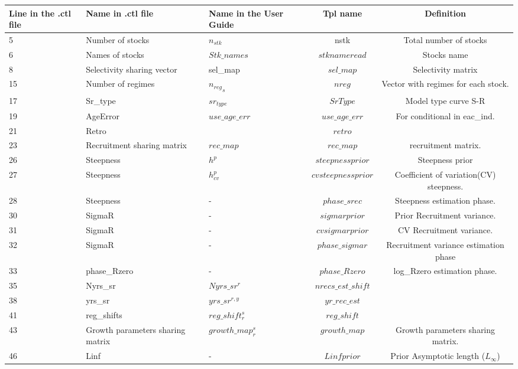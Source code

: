 \documentclass{article}
\begin{document}
\begin{tabular}{|  p{0.9cm} | p{1.9cm}  | p{1.9cm} | c | c |}
\hline
Line in the .ctl file & Name in .ctl file  & Name in the User Guide & Tpl name & Definition\\ \hline  \hline
 5 &  Number of stocks & $n_{stk}$  & nstk & Total number of stocks\\ \hline
6 &  Names of stocks & $Stk\_names$ & $stknameread$   & Stocks name\\ \hline
8 &  Selectivity sharing vector & sel\_map  & $sel\_map$ & Selectivity matrix\\ \hline
15 &  Number of regimes &  ${n_{reg}}_s$ & $nreg$ & Vector with regimes for each stock.\\ \hline
17 &  Sr\_type & $sr_{type}$  & $SrType$ & Model type curve S-R\\ \hline
19 &  AgeError & $use\_age\_err$  & $use\_age\_err$ & For conditional in eac\_ind.\\ \hline
21 &  Retro &   & $retro$ &\\ \hline
23 & Recruitment sharing matrix &  $rec\_map$ & $rec\_map$ & recruitment matrix.\\ \hline
26 &  Steepness & $h^p$  & $steepnessprior$ & Steepness prior\\ \hline
27 &  Steepness & $h^p_{cv}$  & $cvsteepnessprior$ & Coefficient of variation(CV) steepness.\\ \hline
28 &  Steepness & -  & $phase\_srec$ & Steepness estimation phase.\\ \hline
30 &  SigmaR &  - & $sigmarprior$ & Prior Recruitment variance.
\\ \hline
31 &  SigmaR &  - & $cvsigmarprior$ & CV Recruitment variance.\\ \hline
32 &  SigmaR & -  & $phase\_sigmar$ & Recruitment variance estimation phase \\ \hline
33 &  phase\_Rzero & -  & $phase\_Rzero$ & log\_Rzero estimation phase.\\ \hline
35 &  Nyrs\_sr &   $Nyrs\_sr^r$& $nrecs\_est\_shift$ & \\ \hline
38 &  yrs\_sr & $yrs\_sr^{r,y}$  & $yr\_rec\_est$ &\\ \hline
41 &  reg\_shifts &  $reg\_shift^s_{r}$  & $reg\_shift$ & \\ \hline
43 &  Growth parameters sharing matrix &  $growth\_map^s_{r}$ & $growth\_map$ & Growth parameters sharing matrix.\\ \hline
46 &  Linf &  - & $Linfprior$ & Prior  Asymptotic length ($L_{\infty}$)\\ \hline

\end{tabular}
\end{document}
